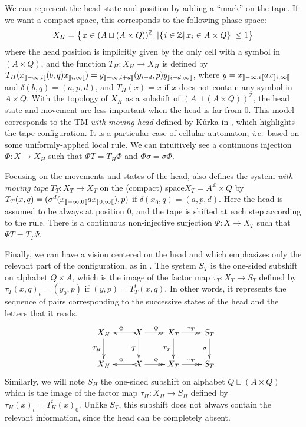 \documentclass{llncs}
\newcommand{\az}{A^\Zset}
\newcommand{\Zset}{{\mathbb Z}}
\newcommand{\card}[1]{\left|#1\right|}
\newcommand{\sett}[2]{\left\{\left.#1\vphantom{#2}\right|#2\right\}}
\newcommand{\set}[3]{\sett{#1\in#2}{#3}}
\newcommand{\ie}{\textit{i.e.}\ }
\begin{document}
We can represent the head state and position by adding a ``mark'' on the tape.
If we want a compact space, this corresponds to the following phase space:
\[X_H=\set x{(A\sqcup(A\times Q))^\Zset}{\card{\set i{\Zset}{x_i\in A\times Q}}\le1}\]
where the head position is implicitly given by the only cell with a symbol in $(A\times Q)$, and the function $T_H: X_H\longrightarrow X_H$ is defined by $T_H(x_{\left\rrbracket -\infty,i\right\llbracket}(b,q)x_{\left\rrbracket i,\infty\right\llbracket})=y_{\left\rrbracket -\infty,i+d\right\llbracket}(y_{i+d},p)y_{\left\rrbracket i+d,\infty\right\llbracket}$, where $y=x_{\left\rrbracket -\infty,i\right\llbracket}ax_{\left\rrbracket i,\infty\right\llbracket}$ and $\delta(b,q)=(a,p,d)$, and $T_H(x)=x$ if $x$ does not contain any symbol in $A\times Q$.
With the topology of $X_H$ as a subshift of $(A\sqcup(A\times Q))^\Zset$, the head state and movement are less important when the head is far from $0$.
This model corresponds to the TM \emph{with moving head} defined by K\r urka in \cite{Kurk}, which highlights the tape configuration. It is a particular case of cellular automaton, \ie based on some uniformly-applied local rule.
We can intuitively see a continuous injection $\Phi:X\to X_H$ such that $\Phi T=T_H\Phi$ and $\Phi\sigma=\sigma\Phi$.

Focusing on the movements and states of the head, \cite{Kurk} also defines the system \emph{with moving tape} $T_T:X_T\to X_T$ on the (compact) space\break $X_T=\az\times Q$ by $T_T(x,q)=(\sigma^d(x_{\left\rrbracket -\infty,0\right\llbracket}ax_{\left\rrbracket 0,\infty\right\llbracket}),p)$ if $\delta(x_0,q)=(a,p,d).$
Here the head is assumed to be always at position $0$, and the tape is shifted at each step according to the rule.
There is a continuous non-injective surjection $\Psi:X\to X_T$ such that $\Psi T=T_T\Psi$.

Finally, we can have a vision centered on the head and which emphasizes only the relevant part of the configuration, as in \cite{Gaja07,GajaJAC}.
The system $S_T$ is the one-sided subshift on alphabet $Q\times A$, which is the image of the factor map $\tau_T:X_T\to S_T$ defined by $\tau_T(x,q)_t=(y_0,p)$ if $(y,p)=T_T^t(x,q)$.
In other words, it represents the sequence of pairs corresponding to the successive states of the head and the letters that it reads.
{\[
\xymatrix{
   X_H \ar[d]_{T_H}& X \ar@{>->}[l]_\Phi \ar[d]_T \ar@{->>}[r]^\Psi& X_T \ar[d]_{T_T} \ar@{->>}[r]^{\tau_T} & S_T \ar[d]_\sigma
   \\
   X_H & X \ar@{>->}[l]_\Phi \ar@{->>}[r]^\Psi & X_T \ar@{->>}[r]^{\tau_T} & S_T
 }
\]
}
Similarly, we will note $S_H$ the one-sided subshift on alphabet $Q\sqcup(A\times Q)$ which is the image of the factor map $\tau_H:X_H\to S_H$ defined by $\tau_H(x)_t=T_H^t(x)_0$. Unlike $S_T$, this subshift does not always contain the relevant information, since the head can be completely absent.
\end{document}
